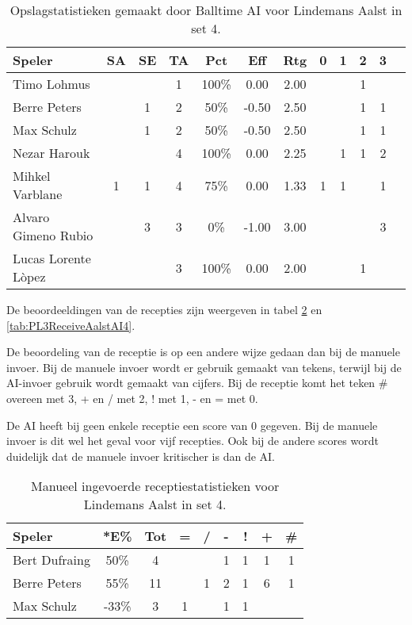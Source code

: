 \begin{table}[ht!]
  \centering
  \scriptsize
  \begin{tabular}{|l|c|c|c|c|c|c|c|c|c|c|c|} \hline
    \textbf{Speler} & SA & SE & TA & Pct & Eff & Rtg & 0 & 1 & 2 & 3  \\ \hline
    Timo Lohmus &  &  & 1 & 100\% & 0.00 & 2.00 &   & &  1 &  \\
    Berre Peters &  & 1 & 2 & 50\% & -0.50 & 2.50 &   &  & 1 & 1 \\
    Max Schulz &  & 1 & 2 & 50\% & -0.50 & 2.50 &   &  & 1 & 1 \\
    Nezar Harouk &  &  & 4 & 100\% & 0.00 & 2.25 &   & 1 & 1 & 2 \\
    Mihkel Varblane & 1 & 1 & 4 & 75\% & 0.00 & 1.33 & 1 & 1 &   & 1 \\
    Alvaro Gimeno Rubio &  & 3 & 3 & 0\% & -1.00 & 3.00 &   &   &  & 3  \\
    Lucas Lorente Lòpez &  &  & 3 & 100\% & 0.00 & 2.00 &   &  &  1 &  \\\hline
  \end{tabular}
  \caption[Opslagstatistieken gemaakt door Balltime AI voor Lindemans Aalst in set 4]{\label{tab:PL3ServeAalstAI4}Opslagstatistieken gemaakt door Balltime AI voor Lindemans Aalst in set 4.}
\end{table}

De beoordeeldingen van de recepties zijn weergeven in tabel \ref{tab:PL3ReceiveAalstMan4} en \ref{tab:PL3ReceiveAalstAI4}.

De beoordeling van de receptie is op een andere wijze gedaan dan bij de manuele invoer. Bij de manuele invoer wordt er gebruik gemaakt van tekens, terwijl bij de AI-invoer gebruik wordt gemaakt van cijfers. Bij de receptie komt het teken \# overeen met 3, + en / met 2, ! met 1, - en = met 0.

De AI heeft bij geen enkele receptie een score van 0 gegeven. Bij de manuele invoer is dit wel het geval voor vijf recepties. Ook bij de andere scores wordt duidelijk dat de manuele invoer kritischer is dan de AI.

\begin{table}[ht!]
    \centering
    \scriptsize
    \begin{tabular}{|l|c|c|c|c|c|c|c|c|}
        \hline
        \textbf{Speler} & *E\% & Tot & = & / & - & ! & + & \# \\ \hline
        Bert Dufraing & 50\% & 4 &  &  & 1 & 1 & 1 & 1\\ 
        Berre Peters & 55\% & 11 & & 1 & 2 & 1 & 6 & 1 \\ 
        Max Schulz & -33\% & 3 & 1 &  & 1 & 1 &  & \\ \hline
    \end{tabular}
    \caption[Manueel ingevoerde receptiestatistieken voor Lindemans Aalst in set 4]{\label{tab:PL3ReceiveAalstMan4}Manueel ingevoerde receptiestatistieken voor Lindemans Aalst in set 4.}
\end{table}

